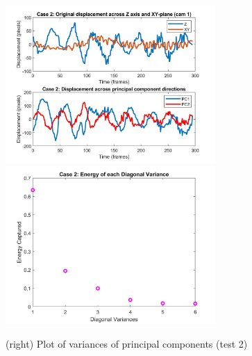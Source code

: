 \documentclass{article}
\begin{document}
\begin{figure}[H]
\begin{center}
\includegraphics[width = 8cm]{oscmotion2}
\includegraphics[width = 8cm]{energy2}
\caption{\label{fig:scaled_diss} (left) Plots of original z displacement vs new basis (test2) }
\caption{\label{fig:scaled_diss} (right) Plot of variances of principal components (test 2)}
\end{center}
\end{figure}
\end{document}
